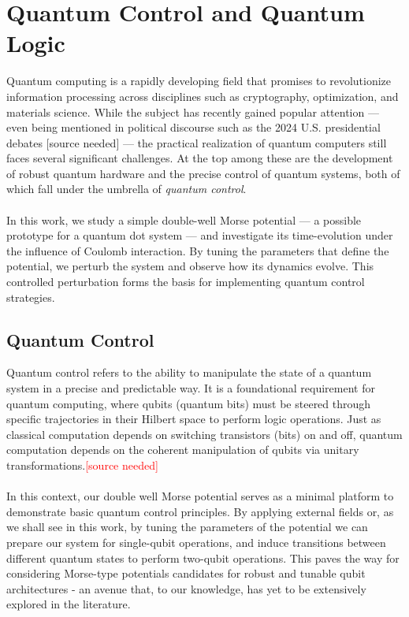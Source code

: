 \documentclass{subfiles}
\begin{document}
\section{Quantum Control and Quantum Logic}
Quantum computing is a rapidly developing field that promises to revolutionize information processing across disciplines such as cryptography, optimization, and materials science. While the subject has recently gained popular attention — even being mentioned in political discourse such as the 2024 U.S. presidential debates [source needed] — the practical realization of quantum computers still faces several significant challenges. At the top among these are the development of robust quantum hardware and the precise control of quantum systems, both of which fall under the umbrella of \emph{quantum control}. \\ \\
In this work, we study a simple double-well Morse potential — a possible prototype for a quantum dot system — and investigate its time-evolution under the influence of Coulomb interaction. By tuning the parameters that define the potential, we perturb the system and observe how its dynamics evolve. This controlled perturbation forms the basis for implementing quantum control strategies.

\subsection*{Quantum Control}
Quantum control refers to the ability to manipulate the state of a quantum system in a precise and predictable way. It is a foundational requirement for quantum computing, where qubits (quantum bits) must be steered through specific trajectories in their Hilbert space to perform logic operations. Just as classical computation depends on switching transistors (bits) on and off, quantum computation depends on the coherent manipulation of qubits via unitary transformations.\textcolor{red}{[source needed]} \\ \\In this context, our double well Morse potential serves as a minimal platform to demonstrate basic quantum control principles. By applying external fields or, as we shall see in this work, by tuning the parameters of the potential we can prepare our system for single-qubit operations, and induce transitions between different quantum states to perform two-qubit operations. This paves the way for considering Morse-type potentials candidates for robust and tunable qubit architectures - an avenue that, to our knowledge, has yet to be extensively explored in the literature. \\ \\ 
\end{document}
